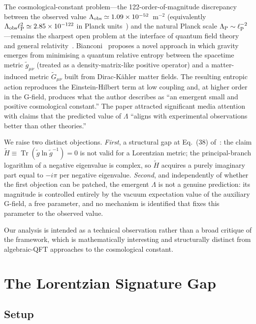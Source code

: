 \documentclass[aps,prd,twocolumn,preprintnumbers,superscriptaddress]{revtex4-2}
\newcommand{\tg}{\tilde{g}}
\newcommand{\tG}{\tilde{G}}
\newcommand{\tr}{\operatorname{Tr}}
\newcommand{\lP}{\ell_{\rm P}}
\newcommand{\Lobs}{\Lambda_{\rm obs}}
\newcommand{\Lpl}{\Lambda_{\rm P}}
\newcommand{\iunit}{i}
\begin{document}
The cosmological-constant problem---the 122-order-of-magnitude discrepancy
between the observed value
$\Lobs \simeq 1.09\times 10^{-52}$~m$^{-2}$ (equivalently
$\Lobs\lP^2 \simeq 2.85\times 10^{-122}$ in Planck units~\cite{PDG2024})
and the natural Planck scale $\Lpl \sim \lP^{-2}$---remains the sharpest
open problem at the interface of quantum field theory and general
relativity~\cite{Weinberg1989,Carroll2001,Peebles2003}.
Bianconi~\cite{Bianconi2025} proposes a novel approach in which gravity
emerges from minimising a quantum relative entropy between the spacetime
metric $\tg_{\mu\nu}$ (treated as a density-matrix-like positive operator)
and a matter-induced metric $\tG_{\mu\nu}$ built from Dirac-K\"{a}hler
matter fields.  The resulting entropic action reproduces the
Einstein-Hilbert term at low coupling and, at higher order in the G-field,
produces what the author describes as ``an emergent small and positive
cosmological constant.''  The paper attracted significant media
attention with claims that the predicted value of $\Lambda$ ``aligns with
experimental observations better than other theories.''

We raise two distinct objections.
\emph{First}, a structural gap at Eq.~(38) of~\cite{Bianconi2025}: the claim
$\tilde{H}\equiv\tr(\tg\ln\tg^{-1}) = 0$ is not valid for a Lorentzian
metric; the principal-branch logarithm of a negative eigenvalue is complex,
so $\tilde{H}$ acquires a purely imaginary part equal to $-\iunit\pi$ per
negative eigenvalue.
\emph{Second}, and independently of whether the first objection can be
patched, the emergent $\Lambda$ is not a genuine prediction: its magnitude
is controlled entirely by the vacuum expectation value of the auxiliary
G-field, a free parameter, and no mechanism is identified that fixes this
parameter to the observed value.

Our analysis is intended as a technical observation rather than a broad
critique of the framework, which is mathematically interesting and
structurally distinct from algebraic-QFT approaches to the cosmological
constant.

\section{The Lorentzian Signature Gap}
\label{sec:gap}

\subsection{Setup}
\end{document}
